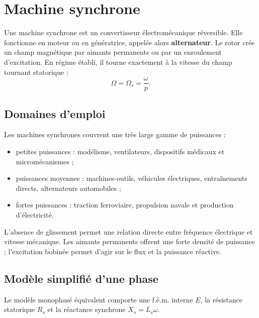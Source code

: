 
\section{Machine synchrone}
\label{sec:masms-5}

Une machine synchrone est un convertisseur électromécanique réversible. Elle fonctionne en moteur ou en génératrice, appelée alors \textbf{alternateur}. Le rotor crée un champ magnétique par aimants permanents ou par un enroulement d'excitation. En régime établi, il tourne exactement à la vitesse du champ tournant statorique :
\[
\boxed{\Omega=\Omega_s=\frac{\omega}{p}.}
\]

\subsection{Domaines d'emploi}

Les machines synchrones couvrent une très large gamme de puissances :
\begin{itemize}
  \item petites puissances : modélisme, ventilateurs, dispositifs médicaux et micromécanismes ;
  \item puissances moyennes : machines-outils, véhicules électriques, entraînements directs, alternateurs automobiles ;
  \item fortes puissances : traction ferroviaire, propulsion navale et production d'électricité.
\end{itemize}

L'absence de glissement permet une relation directe entre fréquence électrique et vitesse mécanique. Les aimants permanents offrent une forte densité de puissance ; l'excitation bobinée permet d'agir sur le flux et la puissance réactive.

\subsection{Modèle simplifié d'une phase}

Le modèle monophasé équivalent comporte une f.é.m. interne $\underline E$, la résistance statorique $R_s$ et la réactance synchrone $X_s=L_s\omega$.

\begin{center}\TLSchemaEquivalentMS\end{center}

